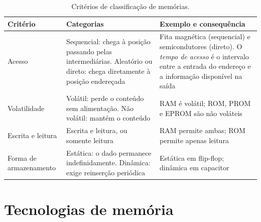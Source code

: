 \begin{table}[H]
  \centering
  \caption{Critérios de classificação de memórias.}
  \label{tab:classificacao-memoria}
  \begin{tabular}{p{3.0cm} p{5.0cm} p{6.6cm}}
    \toprule
    Critério & Categorias & Exemplo e consequência \\
    \midrule
    Acesso
      & Sequencial: chega à posição passando pelas intermediárias. Aleatório ou direto: chega
diretamente à posição endereçada
      & Fita magnética (sequencial) e semicondutores (direto). O \emph{tempo de acesso} é o
intervalo entre a entrada do endereço e a informação disponível na saída \\
    Volatilidade
      & Volátil: perde o conteúdo sem alimentação. Não volátil: mantém o conteúdo
      & RAM é volátil; ROM, PROM e EPROM são não voláteis \\
    Escrita e leitura
      & Escrita e leitura, ou somente leitura
      & RAM permite ambas; ROM permite apenas leitura \\
    Forma de armazenamento
      & Estática: o dado permanece indefinidamente. Dinâmica: exige reinserção periódica
      & Estática em flip-flop; dinâmica em capacitor \\
    \bottomrule
  \end{tabular}
\end{table}

\section{Tecnologias de memória}

